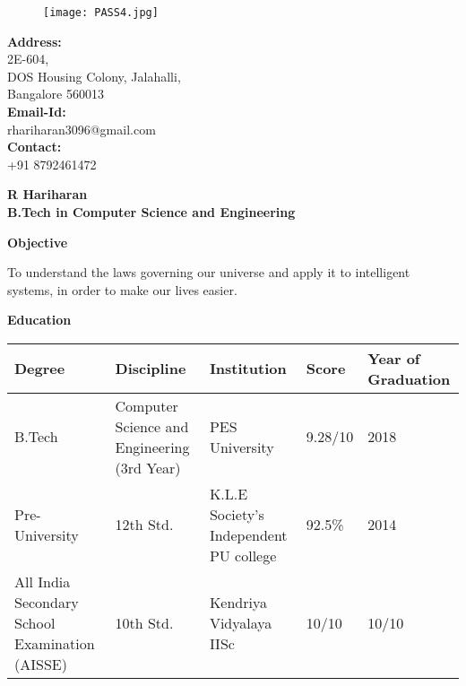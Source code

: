 \documentclass[a4paper,12pt,final]{memoir}
\newcommand{\Sep}{\vspace{1.5em}}
\newcommand{\SmallSep}{\vspace{0.5em}}
\newcommand{\CVSection}[1]
{\Large\textbf{#1}\par
	\SmallSep\normalsize\normalfont}
\begin{document}
	
	\begin{figure}
		\texttt{[image: PASS4.jpg]}
		\vspace{-7cm}
	\end{figure}
	
	\begin{flushleft}\small
		\textbf{Address:} \\
		2E-604, \\
		DOS Housing Colony,
		Jalahalli, \\
		Bangalore 560013\\
		\textbf{Email-Id:} \\
		rhariharan3096@gmail.com  \\
		\textbf{Contact:}\\
		+91 8792461472
	\end{flushleft}\normalsize
	\framebreak
	
	
	\Huge\bfseries {\color{RoyalBlue} R Hariharan} \\
	\small\bfseries B.Tech in Computer Science and Engineering \\
	
	\normalsize\normalfont
	
	
	\CVSection{Objective}
	To understand the laws governing our universe and apply it to intelligent systems, in order to make our lives easier.
	\Sep
	
	\CVSection{Education}
	\def\arraystretch{1.5}
	\begin{tabular}{C{2cm} C{3cm} C{2.3cm} C{2cm} C{2.3cm}}
		\hline
		\hline
		\textbf{Degree} & \textbf{Discipline} & \textbf{Institution} &  \textbf{Score} & \textbf{Year of Graduation}\\
		\hline
		\hline
		B.Tech & Computer Science and Engineering (3rd Year) & PES University & 9.28/10 & 2018 \\
		\hline
		Pre-University & 12th Std. & K.L.E Society’s Independent PU college & 92.5\% & 2014\\
		\hline
		All India Secondary School Examination (AISSE) & 10th Std. & Kendriya Vidyalaya IISc & 10/10 & 10/10\\
		\hline
		\hline
	\end{tabular}
	\Sep
	
\end{document}

